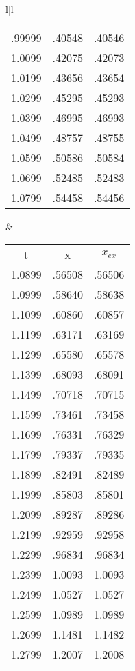 \begin{figure}
\begin{tabular}{l|l}
\begin{tabular}{ccc}
            .99999 & .40548 & .40546 \\  
            1.0099 & .42075 & .42073 \\  
            1.0199 & .43656 & .43654 \\  
            1.0299 & .45295 & .45293 \\  
            1.0399 & .46995 & .46993 \\  
            1.0499 & .48757 & .48755 \\  
            1.0599 & .50586 & .50584 \\  
            1.0699 & .52485 & .52483 \\  
            1.0799 & .54458 & .54456 \\ 
        \end{tabular}
        &
        \begin{tabular}{ccc}
            \multicolumn{1}{c}{t} &  \multicolumn{1}{c}{x}  & \multicolumn{1}{c}{$x_{ex}$}\\
            1.0899 & .56508 & .56506 \\
            1.0999 & .58640 & .58638 \\
            1.1099 & .60860 & .60857 \\
            1.1199 & .63171 & .63169 \\
            1.1299 & .65580 & .65578 \\
            1.1399 & .68093 & .68091 \\
            1.1499 & .70718 & .70715 \\
            1.1599 & .73461 & .73458 \\
            1.1699 & .76331 & .76329 \\
            1.1799 & .79337 & .79335 \\
            1.1899 & .82491 & .82489 \\
            1.1999 & .85803 & .85801 \\
            1.2099 & .89287 & .89286 \\
            1.2199 & .92959 & .92958 \\
            1.2299 & .96834 & .96834 \\
            1.2399 & 1.0093 & 1.0093 \\
            1.2499 & 1.0527 & 1.0527 \\
            1.2599 & 1.0989 & 1.0989 \\
            1.2699 & 1.1481 & 1.1482 \\
            1.2799 & 1.2007 & 1.2008 \\

\end{tabular}
\end{tabular}
\end{figure}
